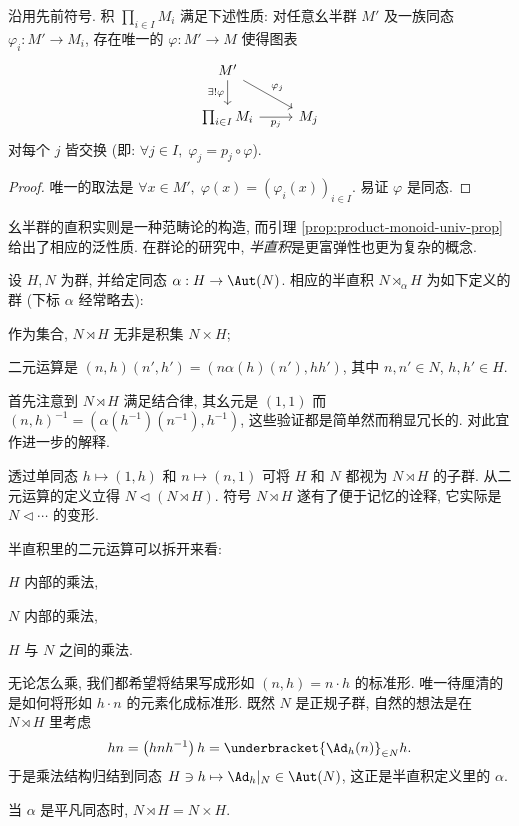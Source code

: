 \begin{lemma}\label{prop:product-monoid-univ-prop}
	沿用先前符号. 积 $\prod_{i \in I} M_i$ 满足下述性质: 对任意幺半群 $M'$ 及一族同态 $\varphi_i: M' \to M_i$, 存在唯一的 $\varphi: M' \to M$ 使得图表
	\[ \begin{tikzcd}
		M' \arrow[rd, "\varphi_j"] \arrow[d, "{\exists! \varphi}"'] & \\
		\prod_{i \in I} M_i \arrow[r, "p_j"'] & M_j
	\end{tikzcd} \]
	对每个 $j$ 皆交换 (即: $\forall j \in I, \; \varphi_j = p_j \circ \varphi$).
\end{lemma}
\begin{proof}
	唯一的取法是 $\forall x \in M', \; \varphi(x) = (\varphi_i(x))_{i \in I}$. 易证 $\varphi$ 是同态.
\end{proof}

幺半群的直积实则是一种范畴论的构造, 而引理 \ref{prop:product-monoid-univ-prop} 给出了相应的泛性质. 在群论的研究中, \emph{半直积}是更富弹性也更为复杂的概念.

\begin{definition}[群的半直积]
	设 $H, N$ 为群, 并给定同态 $\alpha: H \to \Aut(N)$. 相应的半直积 $N \rtimes_{\alpha} H$ 为如下定义的群 (下标 $\alpha$ 经常略去):
	\begin{compactitem}
		\item 作为集合, $N \rtimes H$ 无非是积集 $N \times H$;
		\item 二元运算是 $(n, h)(n', h') = (n \alpha(h)(n'), hh')$, 其中 $n,n' \in N$, $h,h' \in H$.
	\end{compactitem}
\end{definition}

首先注意到 $N \rtimes H$ 满足结合律, 其幺元是 $(1,1)$ 而 $(n,h)^{-1} = (\alpha(h^{-1})(n^{-1}), h^{-1})$, 这些验证都是简单然而稍显冗长的. 对此宜作进一步的解释.
\begin{compactenum}
	\item 透过单同态 $h \mapsto (1, h)$ 和 $n \mapsto (n,1)$ 可将 $H$ 和 $N$ 都视为 $N \rtimes H$ 的子群. 从二元运算的定义立得 $N \lhd (N \rtimes H)$. 符号 $N \rtimes H$ 遂有了便于记忆的诠释, 它实际是 $N \lhd \cdots$ 的变形.
	\item 半直积里的二元运算可以拆开来看:
    \begin{inparaenum}
		\item $H$ 内部的乘法,
		\item $N$ 内部的乘法,
		\item $H$ 与 $N$ 之间的乘法.
	\end{inparaenum}
	无论怎么乘, 我们都希望将结果写成形如 $(n, h) = n \cdot h$ 的标准形. 唯一待厘清的是如何将形如 $h \cdot n$ 的元素化成标准形. 既然 $N$ 是正规子群, 自然的想法是在 $N \rtimes H$ 里考虑
	\begin{gather}\label{eqn:semidirect-multiplication}
		hn = \left( h n h^{-1} \right) h = \underbracket{\Ad_h(n)}_{\in N} h.
	\end{gather}
	于是乘法结构归结到同态 $H \ni h \mapsto \Ad_h|_N \in \Aut(N)$, 这正是半直积定义里的 $\alpha$.
	\item 当 $\alpha$ 是平凡同态时, $N \rtimes H = N \times H$.
\end{compactenum}

